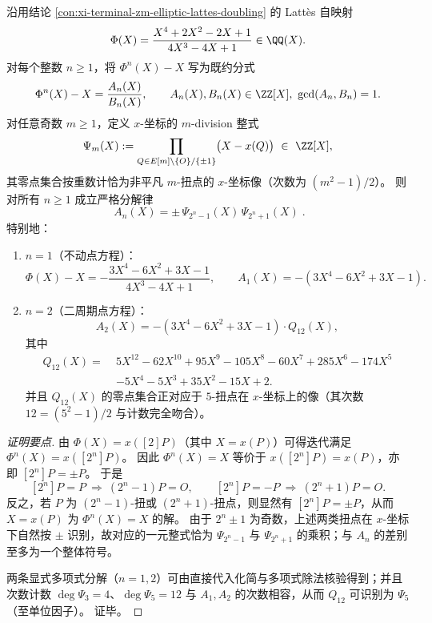 

\begin{conclusion}[Latt\`es 周期点方程的整式分解：\texorpdfstring{$\Phi^n(X)=X$}{Phi^n(X)=X} 的分子由 \texorpdfstring{$(2^n\pm1)$}{(2^n±1)}-division 乘积给出]\label{con:xi-terminal-zm-elliptic-lattes-periodic-division-factorization}
沿用结论 \ref{con:xi-terminal-zm-elliptic-lattes-doubling} 的 Latt\`es 自映射
\[
\Phi(X)=\frac{X^4+2X^2-2X+1}{4X^3-4X+1}\in\QQ(X).
\]
对每个整数 \(n\ge 1\)，将 \(\Phi^n(X)-X\) 写为既约分式
\[
\Phi^n(X)-X=\frac{A_n(X)}{B_n(X)},
\qquad
A_n(X),B_n(X)\in\ZZ[X],\ \gcd(A_n,B_n)=1.
\]
对任意奇数 \(m\ge 1\)，定义 \(x\)-坐标的 \(m\)-division 整式
\[
\Psi_m(X):=\prod_{Q\in E[m]\setminus\{O\}/\{\pm1\}}\bigl(X-x(Q)\bigr)\ \in\ \ZZ[X],
\]
其零点集合按重数计恰为非平凡 \(m\)-扭点的 \(x\)-坐标像（次数为 \((m^2-1)/2\)）。
则对所有 \(n\ge 1\) 成立严格分解律
\[
\boxed{\;
A_n(X)=\pm\,\Psi_{2^n-1}(X)\,\Psi_{2^n+1}(X)\; }.
\]
特别地：
\begin{enumerate}
  \item \(n=1\)（不动点方程）：
  \[
  \Phi(X)-X=-\frac{3X^4-6X^2+3X-1}{4X^3-4X+1},
  \qquad
  A_1(X)=-(3X^4-6X^2+3X-1).
  \]
  \item \(n=2\)（二周期点方程）：
  \[
  A_2(X)=-(3X^4-6X^2+3X-1)\cdot Q_{12}(X),
  \]
  其中
  \[
  \begin{aligned}
  Q_{12}(X)=\;&5X^{12}-62X^{10}+95X^{9}-105X^{8}-60X^{7}+285X^{6}-174X^{5}\\
  &-5X^{4}-5X^{3}+35X^{2}-15X+2.
  \end{aligned}
  \]
  并且 \(Q_{12}(X)\) 的零点集合正对应于 \(5\)-扭点在 \(x\)-坐标上的像（其次数 \(12=(5^2-1)/2\) 与计数完全吻合）。
\end{enumerate}
\end{conclusion}
\begin{proof}[证明要点]
由 \(\Phi(X)=x([2]P)\)（其中 \(X=x(P)\)）可得迭代满足 \(\Phi^n(X)=x([2^n]P)\)。
因此 \(\Phi^n(X)=X\) 等价于 \(x([2^n]P)=x(P)\)，亦即 \([2^n]P=\pm P\)。
于是
\[
[2^n]P=P\ \Longrightarrow\ (2^n-1)P=O,
\qquad
[2^n]P=-P\ \Longrightarrow\ (2^n+1)P=O.
\]
反之，若 \(P\) 为 \((2^n-1)\)-扭或 \((2^n+1)\)-扭点，则显然有 \([2^n]P=\pm P\)，从而 \(X=x(P)\) 为 \(\Phi^n(X)=X\) 的解。
由于 \(2^n\pm1\) 为奇数，上述两类扭点在 \(x\)-坐标下自然按 \(\pm\) 识别，故对应的一元整式恰为 \(\Psi_{2^n-1}\) 与 \(\Psi_{2^n+1}\) 的乘积；与 \(A_n\) 的差别至多为一个整体符号。
\par
两条显式多项式分解（\(n=1,2\)）可由直接代入化简与多项式除法核验得到；并且次数计数 \(\deg \Psi_3=4\)、\(\deg \Psi_5=12\) 与 \(A_1,A_2\) 的次数相容，从而 \(Q_{12}\) 可识别为 \(\Psi_5\)（至单位因子）。
证毕。
\end{proof}

